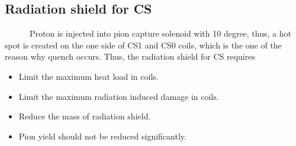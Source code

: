 \subsection{Radiation shield for CS}
~~~~~~Proton is injected into pion capture solenoid with 10 degree, thus, a hot spot is created on the one side of CS1 and CS0 coils, which is the one of the reason why quench occurs.
Thus, the radiation shield for CS requires
\begin{itemize}
 \setlength{\itemsep}{-5pt}
 \item Limit the maximum heat load in coils.
 \item Limit the maximum radiation induced damage in coils.
 \item Reduce the mass of radiation shield.
 \item Pion yield should not be reduced significantly.
\end{itemize}

